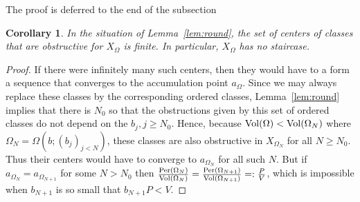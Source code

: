 \documentclass[11pt, reqno]{amsart}
\newtheorem{cor}[thm]{Corollary}
\theoremstyle{remark}
\numberwithin{equation}{subsection}
\numberwithin{figure}{section}
\theoremstyle{customremark}
\newcommand{\Vol}{{\rm Vol}}
\newcommand{\Per}{{\rm Per}}
\newcommand{\Om}{{\Omega}}
\begin{document}
The proof is deferred to the end of the subsection

\begin{cor}\label{cor:round}  In the situation of Lemma~\ref{lem:round}, the set of centers of  classes that are obstructive for $X_\Om$ is finite.
  In particular, $X_\Om$  has no staircase.
\end{cor}
\begin{proof}  If there were infinitely many such centers, then they would have to a form a sequence that converges to
the accumulation point $a_\Om$.  Since we may always replace these classes by the corresponding ordered classes,  Lemma~\ref{lem:round} implies that there is $N_0$ so that the obstructions given by this set of ordered classes do not depend on the $b_j, j\ge N_0$. Hence, because $\Vol(\Om) < \Vol(\Om_N)$ where $\Om_N = \Om(b; (b_j)_{j <N})$,
 these classes are also obstructive in $X_{\Om_N}$ for all $N\ge N_0$. Thus their centers would have to converge to $a_{\Om_N}$
 for all such $N$.  But if $a_{\Om_{N}} = a_{\Om_{N+1}}$ for some $N>N_0$ then  $\frac{\Per(\Om_{N})}{\Vol(\Om_{N})} = 
 \frac{\Per(\Om_{N+1})}{\Vol(\Om_{N+1})} = :\frac PV $, which is impossible when $b_{N+1}$ is so small that $b_{N+1} P < V$.
\end{proof}
\end{document}
